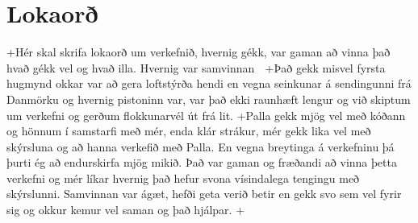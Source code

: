 \section{Lokaorð}
\cite{brock}
+Hér skal skrifa lokaorð um verkefnið, hvernig gékk, var gaman að vinna það hvað gékk vel og hvað illa. Hvernig var samvinnan 🙂
+Það gekk misvel fyrsta hugmynd okkar var að gera loftstýrða hendi en vegna seinkunar á sendingunni frá Danmörku og hvernig pistoninn var, var það ekki raunhæft lengur og við skiptum um verkefni og gerðum flokkunarvél út frá lit.
+Palla gekk mjög vel með kóðann og hönnum í samstarfi með mér, enda klár strákur, mér gekk lika vel með skýrsluna og að hanna verkefið með Palla. En vegna breytinga á verkefninu þá þurti ég að endurskirfa mjög mikið. Það var gaman og fræðandi að vinna þetta verkefni og mér líkar hvernig það hefur svona vísindalega tengingu með skýrslunni. Samvinnan var ágæt, hefði geta verið betir en gekk svo sem vel fyrir sig og okkur kemur vel saman og það hjálpar.
+\cite{brock}